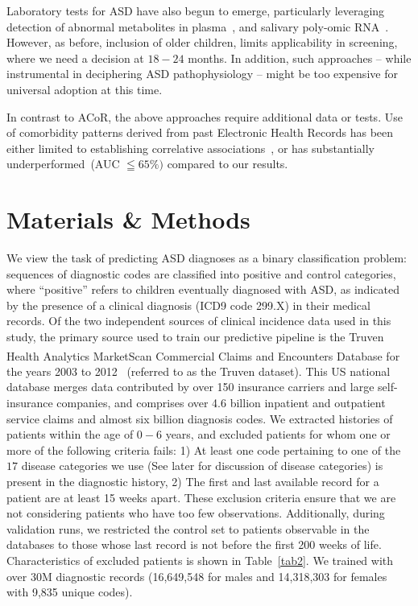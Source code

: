 \documentclass[onecolumn,,10pt]{IEEEtran}
\def\acor{ACoR\xspace}
\begin{document}
Laboratory tests for ASD have also begun to emerge, particularly leveraging detection of abnormal metabolites in plasma~\cite{smith2020metabolomics,howsmon2017classification}, and  salivary poly-omic RNA~\cite{hicks2018validation}. However, as before, inclusion  of older children, limits  applicability in  screening, where we need a decision at $18-24$ months. In addition, such approaches -- while  instrumental in deciphering ASD pathophysiology -- might be too expensive for universal adoption at this time.

In contrast to \acor, the above approaches require additional data or tests. Use of comorbidity patterns derived from past  Electronic Health Records  has been either limited to establishing correlative associations~\cite{doshi2014comorbidity,bishop2018using}, or has substantially underperformed~\cite{lingren2016electronic}(AUC $\leqq 65\%)$ compared to our results.

\section*{Materials \& Methods}
We view the task of predicting  ASD diagnoses   as a binary classification problem: sequences of diagnostic codes are classified into positive and control categories, where ``positive'' refers to children eventually diagnosed with ASD, as indicated by the presence of a clinical diagnosis (ICD9 code 299.X) in their medical records. Of the two independent sources of clinical incidence data used in this study,  the primary source used to train our predictive pipeline  is the Truven Health Analytics MarketScan\textsuperscript{\textregistered} Commercial Claims and Encounters Database for the years 2003 to 2012~\cite{hansen2017truven} (referred to  as the Truven dataset). This US national database merges  data contributed by over 150 insurance carriers and large self-insurance companies,  and comprises over  4.6 billion inpatient and outpatient service claims and  almost six billion diagnosis codes. We extracted histories of patients within the age of $0-6$ years, and excluded  patients for whom one or more of the following criteria fails:  1) At least one code pertaining to one of the $17$ disease categories we use (See later for discussion of disease categories) is present in the diagnostic history, 2) The first and last available record for a patient are  at least 15 weeks apart. These exclusion criteria ensure that we are not considering patients who have too few observations. Additionally, during validation runs,  we restricted the control set to patients observable in the databases to those whose last record is not before the first 200 weeks of life. Characteristics of excluded patients is shown in Table~\ref{tab2}. We trained with over  30M diagnostic records (16,649,548 for males and  14,318,303  for females with 9,835 unique  codes).
\end{document}
